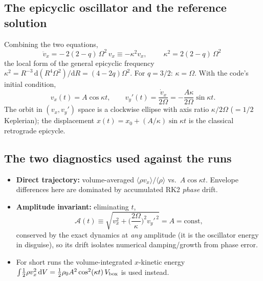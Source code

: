 \documentclass[11pt]{article}
\newcommand{\dd}{\mathrm{d}}
\begin{document}
\subsection{The epicyclic oscillator and the reference solution}
Combining the two equations,
\begin{equation}
\ddot v_x = -\,2(2-q)\,\Omega^2\,v_x \equiv -\kappa^2 v_x,
\qquad
\boxed{\;\kappa^2 = 2(2-q)\,\Omega^2\;}
\end{equation}
the local form of the general epicyclic frequency
$\kappa^2 = R^{-3}\,\dd(R^4\Omega^2)/\dd R = (4-2q)\Omega^2$. For $q = 3/2$:
$\kappa = \Omega$. With the code's initial condition,
\begin{equation}
v_x(t) = A\cos\kappa t,
\qquad
v_y'(t) = \frac{\dot v_x}{2\Omega} = -\frac{A\kappa}{2\Omega}\sin\kappa t .
\end{equation}
The orbit in $(v_x, v_y')$ space is a clockwise ellipse with axis ratio
$\kappa/2\Omega$ ($=1/2$ Keplerian); the displacement
$x(t) = x_0 + (A/\kappa)\sin\kappa t$ is the classical retrograde epicycle.

\subsection{The two diagnostics used against the runs}
\begin{itemize}
\item \textbf{Direct trajectory:} volume-averaged
  $\langle\rho v_x\rangle/\langle\rho\rangle$ vs.\ $A\cos\kappa t$. Envelope
  differences here are dominated by accumulated RK2 \emph{phase} drift.
\item \textbf{Amplitude invariant:} eliminating $t$,
\begin{equation}
\mathcal A(t) \equiv
\sqrt{v_x^2 + \Big(\frac{2\Omega}{\kappa}\Big)^{2} v_y'^{\,2}} = A = \text{const},
\label{eq:invariant}
\end{equation}
conserved by the exact dynamics at \emph{any} amplitude (it is the oscillator
energy in disguise), so its drift isolates numerical damping/growth from phase
error.
\item For short runs the volume-integrated $x$-kinetic energy
  $\int\!\tfrac12\rho v_x^2\,\dd V = \tfrac12\rho_0A^2\cos^2(\kappa t)\,V_{\rm box}$
  is used instead.
\end{itemize}
\end{document}
